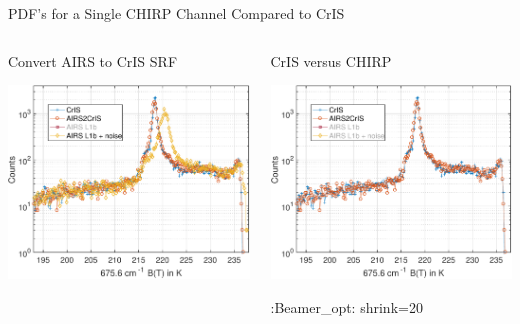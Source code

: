 \documentclass[10pt,t]{beamer}
\begin{document}
\begin{frame}[label={sec:orgbf8eb33}]{PDF's for a Single CHIRP Channel Compared to CrIS}
\vspace{-0.25in}

\begin{columns}
\begin{column}{0.55\columnwidth}
\begin{block}{\footnotesize Convert AIRS to CrIS SRF}
\vspace{-0.05in}
\vspace{-0.05in}
\begin{center}
\includegraphics[width=0.77\linewidth]{./Figs/Pdf/jun4_2015_airs_675wn_global_counts_w_airsnoise_and_cris_a2c.pdf}
\end{center}
\end{block}
\end{column}

\begin{column}{0.55\columnwidth}
\begin{block}{\footnotesize CrIS versus CHIRP}
\vspace{-0.05in}
\vspace{-0.05in}
\begin{center}
\includegraphics[width=0.77\linewidth]{./Figs/Pdf/jun4_2015_airs_675wn_global_counts_w_airsnoise_and_cris_a2c_no_airs.pdf}
\end{center}

:Beamer\_opt: shrink=20
\end{block}
\end{column}
\end{columns}
\end{frame}
\end{document}
